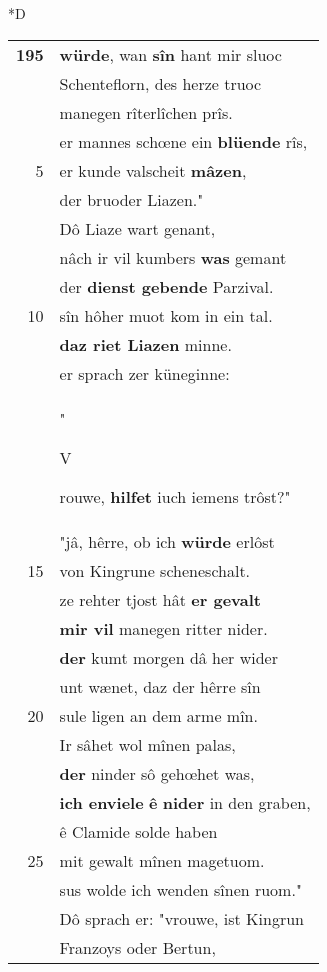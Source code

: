 \documentclass[8pt,a4paper,notitlepage]{article}
\begin{document}
\begin{table}[ht]
\begin{minipage}[t]{0.5\linewidth}
\small
\begin{center}*D
\end{center}
\begin{tabular}{rl}
\textbf{195} & \textbf{würde}, wan \textbf{sîn} hant mir sluoc\\ 
 & Schenteflorn, des herze truoc\\ 
 & manegen rîterlîchen prîs.\\ 
 & er mannes schœne ein \textbf{blüende} rîs,\\ 
5 & er kunde valscheit \textbf{mâzen},\\ 
 & der bruoder Liazen."\\ 
 & Dô Liaze wart genant,\\ 
 & nâch ir vil kumbers \textbf{was} gemant\\ 
 & der \textbf{dienst gebende} Parzival.\\ 
10 & sîn hôher muot kom in ein tal.\\ 
 & \textbf{daz riet Liazen} minne.\\ 
 & er sprach zer küneginne:\\ 
 & "\begin{large}V\end{large}rouwe, \textbf{hilfet} iuch iemens trôst?"\\ 
 & "jâ, hêrre, ob ich \textbf{würde} erlôst\\ 
15 & von Kingrune scheneschalt.\\ 
 & ze rehter tjost hât \textbf{er gevalt}\\ 
 & \textbf{mir vil} manegen ritter nider.\\ 
 & \textbf{der} kumt morgen dâ her wider\\ 
 & unt wænet, daz der hêrre sîn\\ 
20 & sule ligen an dem arme mîn.\\ 
 & Ir sâhet wol mînen palas,\\ 
 & \textbf{der} ninder sô gehœhet was,\\ 
 & \textbf{ich enviele} \textbf{ê} \textbf{nider} in den graben,\\ 
 & ê Clamide solde haben\\ 
25 & mit gewalt mînen magetuom.\\ 
 & sus wolde ich wenden sînen ruom."\\ 
 & Dô sprach er: "vrouwe, ist Kingrun\\ 
 & Franzoys oder Bertun,\\ 

\end{tabular}
\end{minipage}
\end{table}
\end{document}
